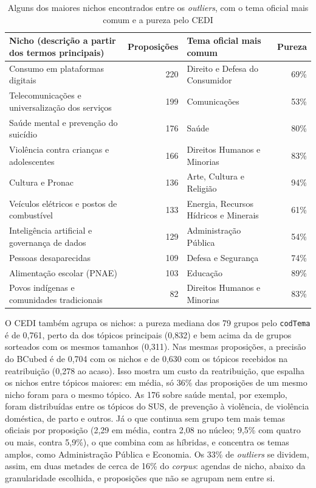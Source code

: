 \begin{table}[H]
\centering
\caption{Alguns dos maiores nichos encontrados entre os \textit{outliers}, com o tema oficial mais comum e a pureza pelo CEDI}
\label{tab:nichos}
\small
\begin{tabularx}{\textwidth}{>{\raggedright\arraybackslash}X r >{\raggedright\arraybackslash}p{4.4cm} r}
\toprule
\textbf{Nicho (descrição a partir dos termos principais)} & \textbf{Proposições} & \textbf{Tema oficial mais comum} & \textbf{Pureza} \\
\midrule
Consumo em plataformas digitais & 220 & Direito e Defesa do Consumidor & 69\% \\
Telecomunicações e universalização dos serviços & 199 & Comunicações & 53\% \\
Saúde mental e prevenção do suicídio & 176 & Saúde & 80\% \\
Violência contra crianças e adolescentes & 166 & Direitos Humanos e Minorias & 83\% \\
Cultura e Pronac & 136 & Arte, Cultura e Religião & 94\% \\
Veículos elétricos e postos de combustível & 133 & Energia, Recursos Hídricos e Minerais & 61\% \\
Inteligência artificial e governança de dados & 129 & Administração Pública & 54\% \\
Pessoas desaparecidas & 109 & Defesa e Segurança & 74\% \\
Alimentação escolar (PNAE) & 103 & Educação & 89\% \\
Povos indígenas e comunidades tradicionais & 82 & Direitos Humanos e Minorias & 83\% \\
\bottomrule
\end{tabularx}
\end{table}

O CEDI também agrupa os nichos: a pureza mediana dos 79 grupos pelo \texttt{codTema} é de 0,761, perto da dos tópicos principais (0,832) e bem acima da de grupos sorteados com os mesmos tamanhos (0,311). Nas mesmas proposições, a precisão do BCubed é de 0,704 com os nichos e de 0,630 com os tópicos recebidos na reatribuição (0,278 ao acaso). Isso mostra um custo da reatribuição, que espalha os nichos entre tópicos maiores: em média, só 36\% das proposições de um mesmo nicho foram para o mesmo tópico. As 176 sobre saúde mental, por exemplo, foram distribuídas entre os tópicos do SUS, de prevenção à violência, de violência doméstica, de parto e outros. Já o que continua sem grupo tem mais temas oficiais por proposição (2,29 em média, contra 2,08 no núcleo; 9,5\% com quatro ou mais, contra 5,9\%), o que combina com as híbridas, e concentra os temas amplos, como Administração Pública e Economia. Os 33\% de \textit{outliers} se dividem, assim, em duas metades de cerca de 16\% do \textit{corpus}: agendas de nicho, abaixo da granularidade escolhida, e proposições que não se agrupam nem entre si.

